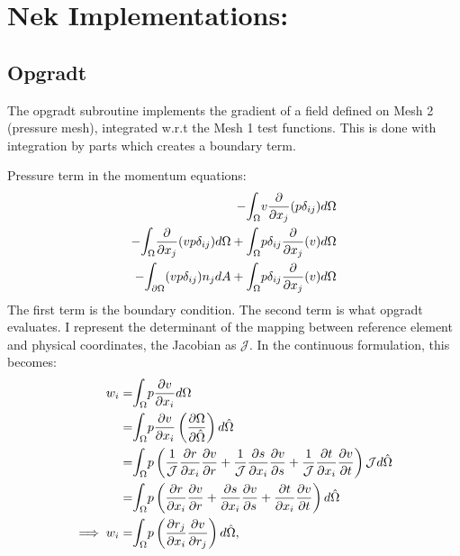 \documentclass{kthreport}
\begin{document}
\section{Nek Implementations:}

\subsection{Opgradt}

The opgradt subroutine implements the gradient of a field defined on Mesh 2 (pressure mesh), integrated w.r.t the Mesh 1 test functions.
This is done with integration by parts which creates a boundary term.

Pressure term in the momentum equations:
\begin{eqnarray}
	 - \mathlarger\int_{\Omega} v\dfrac{\partial }{\partial x_{j}}(p\delta_{ij}) d\Omega \nonumber \\
				  -\mathlarger\int_{\Omega} \dfrac{\partial }{\partial x_{j}}(vp\delta_{ij}) d\Omega + \mathlarger\int_{\Omega} p\delta_{ij}\dfrac{\partial }{\partial x_{j}}(v) d\Omega \nonumber \\
				  -\mathlarger\int_{\partial\Omega} (vp\delta_{ij}) n_{j} dA + \mathlarger\int_{\Omega} p\delta_{ij}\dfrac{\partial }{\partial x_{j}}(v) d\Omega \nonumber 
\end{eqnarray}
The first term is the boundary condition. The second term is what opgradt evaluates. I represent the determinant of the mapping between reference element and physical coordinates, the Jacobian as $\mathcal{J}$. In the continuous formulation, this becomes:
\begin{eqnarray}
	w_{i}	=& \mathlarger\int_{\Omega} p\dfrac{\partial v}{\partial x_{i}} d\Omega \nonumber \\
				 =& \mathlarger\int_{\Omega} p\dfrac{\partial v}{\partial x_{i}} \left(\dfrac{\partial \Omega}{\partial \hat{\Omega}}\right) d\hat{\Omega} \nonumber \\
				 =& \mathlarger\int_{\Omega} p\left(\dfrac{1}{\mathcal{J}}\dfrac{\partial r}{\partial x_{i}}\dfrac{\partial v}{\partial r} + \dfrac{1}{\mathcal{J}}\dfrac{\partial s}{\partial x_{i}}\dfrac{\partial v}{\partial s} + \dfrac{1}{\mathcal{J}}\dfrac{\partial t}{\partial x_{i}}\dfrac{\partial v}{\partial t}\right)\mathcal{J} d\hat{\Omega} \nonumber \\
				=& \mathlarger\int_{\Omega} p\left(\dfrac{\partial r}{\partial x_{i}}\dfrac{\partial v}{\partial r} + \dfrac{\partial s}{\partial x_{i}}\dfrac{\partial v}{\partial s} + \dfrac{\partial t}{\partial x_{i}}\dfrac{\partial v}{\partial t}\right) d\hat{\Omega} \nonumber \\
\implies w_{i}	=& \mathlarger\int_{\Omega} p\left(\dfrac{\partial r_{j}}{\partial x_{i}}\dfrac{\partial v}{\partial r_{j}}\right) d\hat{\Omega},
\end{eqnarray}
\end{document}
